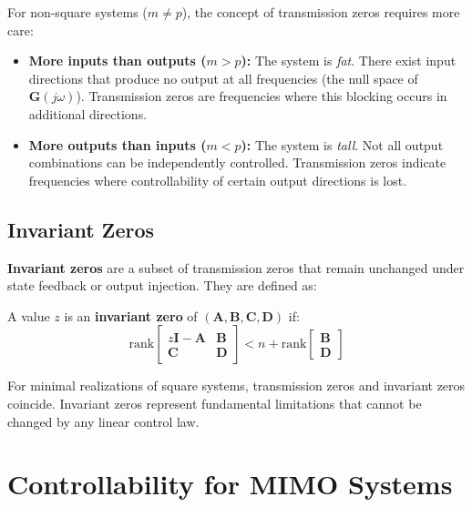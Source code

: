 For non-square systems ($m \neq p$), the concept of transmission zeros requires more care:

\begin{itemize}
\item \textbf{More inputs than outputs ($m > p$):} The system is \textit{fat}. There exist input directions that produce no output at all frequencies (the null space of $\mathbf{G}(j\omega)$). Transmission zeros are frequencies where this blocking occurs in additional directions.

\item \textbf{More outputs than inputs ($m < p$):} The system is \textit{tall}. Not all output combinations can be independently controlled. Transmission zeros indicate frequencies where controllability of certain output directions is lost.
\end{itemize}

\subsection{Invariant Zeros}

\textbf{Invariant zeros} are a subset of transmission zeros that remain unchanged under state feedback or output injection. They are defined as:

\begin{definition}
A value $z$ is an \textbf{invariant zero} of $(\mathbf{A}, \mathbf{B}, \mathbf{C}, \mathbf{D})$ if:
\begin{equation}
\text{rank}\begin{bmatrix} z\mathbf{I} - \mathbf{A} & \mathbf{B} \\ \mathbf{C} & \mathbf{D} \end{bmatrix} < n + \text{rank}\begin{bmatrix} \mathbf{B} \\ \mathbf{D} \end{bmatrix}
\end{equation}
\end{definition}

For minimal realizations of square systems, transmission zeros and invariant zeros coincide. Invariant zeros represent fundamental limitations that cannot be changed by any linear control law.


\section{Controllability for MIMO Systems}
\label{sec:controllability_mimo}

